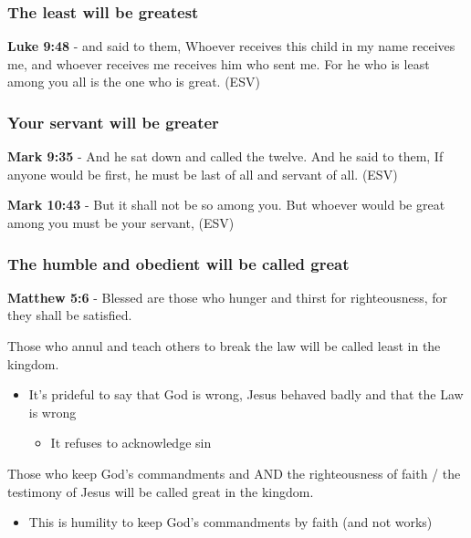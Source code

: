 \documentclass[11pt]{article}
\begin{document}
\subsubsection{The least will be greatest}
\label{sec:org7912674}
\textbf{Luke 9:48} - and said to them, Whoever receives this child in my name receives me, and whoever receives me receives him who sent me. For he who is least among you all is the one who is great. (ESV)

\subsubsection{Your servant will be greater}
\label{sec:orgc33a4e7}

\textbf{Mark 9:35} - And he sat down and called the twelve. And he said to them, If anyone would be first, he must be last of all and servant of all. (ESV)

\textbf{Mark 10:43} - But it shall not be so among you. But whoever would be great among you must be your servant, (ESV)

\subsubsection{The humble and obedient will be called great}
\label{sec:org22f1e20}
\textbf{Matthew 5:6} - Blessed are those who hunger and thirst for righteousness, for they shall be satisfied.

Those who annul and teach others to break the law will be called least in the kingdom.
\begin{itemize}
\item It's prideful to say that God is wrong, Jesus behaved badly and that the Law is wrong
\begin{itemize}
\item It refuses to acknowledge sin
\end{itemize}
\end{itemize}
Those who keep God's commandments and AND the righteousness of faith / the testimony of Jesus will be called great in the kingdom.
\begin{itemize}
\item This is humility to keep God's commandments by faith (and not works)
\end{itemize}
\end{document}
